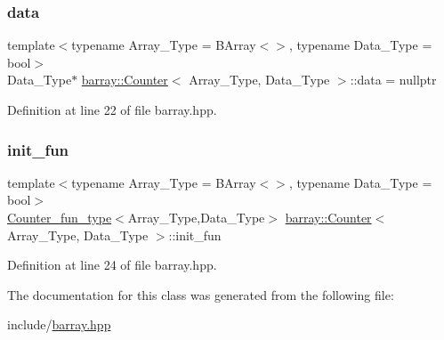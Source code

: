 \subsubsection{\texorpdfstring{data}{data}}
{\footnotesize\ttfamily template$<$typename Array\+\_\+\+Type  = B\+Array$<$$>$, typename Data\+\_\+\+Type  = bool$>$ \\
Data\+\_\+\+Type$\ast$ \hyperlink{classbarray_1_1_counter}{barray\+::\+Counter}$<$ Array\+\_\+\+Type, Data\+\_\+\+Type $>$\+::data = nullptr}



Definition at line 22 of file barray.\+hpp.

\mbox{\label{classbarray_1_1_counter_ac7f0223e4bd27dd7f876a628f14750b7}} 
\subsubsection{\texorpdfstring{init\+\_\+fun}{init\_fun}}
{\footnotesize\ttfamily template$<$typename Array\+\_\+\+Type  = B\+Array$<$$>$, typename Data\+\_\+\+Type  = bool$>$ \\
\hyperlink{namespacebarray_a94903bd0f37708633933ea88ac8e4c6a}{Counter\+\_\+fun\+\_\+type}$<$Array\+\_\+\+Type,Data\+\_\+\+Type$>$ \hyperlink{classbarray_1_1_counter}{barray\+::\+Counter}$<$ Array\+\_\+\+Type, Data\+\_\+\+Type $>$\+::init\+\_\+fun}



Definition at line 24 of file barray.\+hpp.



The documentation for this class was generated from the following file\+:\begin{DoxyCompactItemize}
\item 
include/\hyperlink{barray_8hpp}{barray.\+hpp}\end{DoxyCompactItemize}
